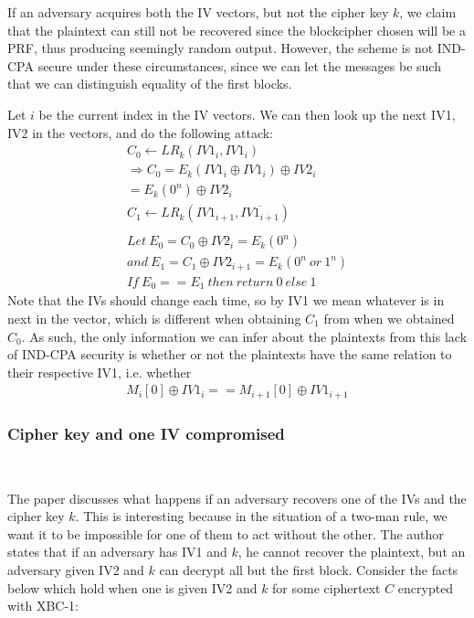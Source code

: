 \documentclass[conference]{IEEEtran}
\begin{document}
If an adversary acquires both the IV vectors, but not the cipher key $k$, we claim that the plaintext can still not be recovered since the blockcipher chosen will be a PRF, thus producing seemingly random output. However, the scheme is not IND-CPA secure under these circumstances, since we can let the messages be such that we can distinguish equality of the first blocks.

Let $i$ be the current index in the IV vectors. We can then look up the next IV1, IV2 in the vectors, and do the following attack:
\begin{gather*}
  C_0 \leftarrow LR_k(IV1_i, IV1_i) \\
  \Rightarrow C_0=E_k(IV1_i \oplus IV1_i) \oplus IV2_i \\
  = E_k(0^n) \oplus IV2_i \\
  C_1 \leftarrow LR_k(IV1_{i+1}, \overline{IV1_{i+1}}) \\ \\
  Let\ E_0=C_0 \oplus IV2_i=E_k(0^n) \\
  and\ E_1=C_1 \oplus IV2_{i+1}=E_k(0^n\ or\ 1^n) \\
  If\ E_0==E_1\ then\ return\ 0\ else\ 1
\end{gather*}
Note that the IVs should change each time, so by IV1 we mean whatever is in next in the vector, which is different when obtaining $C_1$ from when we obtained $C_0$. As such, the only information we can infer about the plaintexts from this lack of IND-CPA security is whether or not the plaintexts have the same relation to their respective IV1, i.e. whether
\begin{gather*}
  M_i[0] \oplus IV1_i == M_{i+1}[0] \oplus IV1_{i+1}
\end{gather*}

\subsubsection{Cipher key and one IV compromised} \
\label{xbc1-k_oneIV}

The paper discusses what happens if an adversary recovers one of the IVs and the cipher key $k$. This is interesting because in the situation of a two-man rule, we want it to be impossible for one of them to act without the other. The author states that if an adversary has IV1 and $k$, he cannot recover the plaintext, but an adversary given IV2 and $k$ can decrypt all but the first block. Consider the facts below which hold when one is given IV2 and $k$ for some ciphertext $C$ encrypted with XBC-1:
\end{document}
